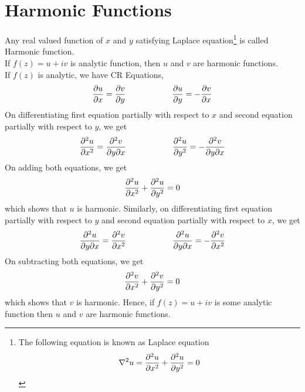 \section{Harmonic Functions}
Any real valued function of $x$ and $y$ satisfying Laplace equation\footnote{The following equation is known as Laplace equation \[\nabla ^2u = \pdn ux2 + \pdn uy2 = 0\]} is called Harmonic function.\\
If $f(z) = u+iv$ is analytic function, then $u$ and $v$ are harmonic functions.\\
If $f(z)$ is analytic, we have CR Equations,
\[\pd ux = \pd vy ~~~~~~~~~~~~~~~~~\pd uy = - \pd vx\]
On differentiating first equation partially with respect to $x$ and second equation partially with respect to $y$, we get
\[\pdn ux2 = \pdxy vxy ~~~~~~~~~~~~~~~~~\pdn uy2 = - \pdxy vxy\]
On adding both equations, we get 
\[\pdn ux2 + \pdn uy2 = 0\]
which shows that $u$ is harmonic.
Similarly, on differentiating first equation partially with respect to $y$ and second equation partially with respect to $x$, we get
\[\pdxy uxy = \pdn vx2 ~~~~~~~~~~~~~~~~~\pdxy uxy = - \pdn vx2\]
On subtracting both equations, we get 
\[\pdn vx2 + \pdn vy2 = 0\]
which shows that $v$ is harmonic.
Hence, if $f(z) = u+iv$ is some analytic function then $u$ and $v$ are harmonic functions.\\

